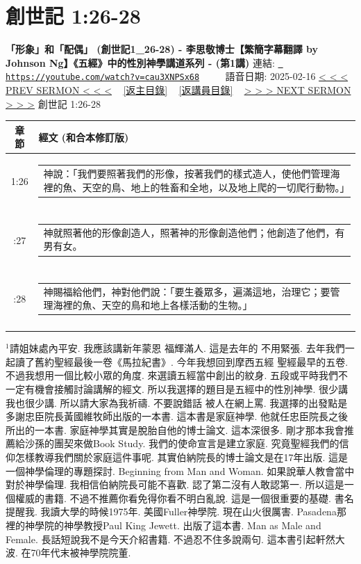 \documentclass{book}
\begin{document}
\section{創世記 1:26-28}
\label{sec:cau3XNPSx68}
\textbf{「形象」和「配偶」 (創世記1\_26-28) - 李思敬博士【繁簡字幕翻譯 by Johnson Ng】《五經》中的性別神學講道系列 - (第1講)}
\newline
\newline
連結: \href{https://youtube.com/watch?v=cau3XNPSx68}{\texttt{ https://youtube.com/watch?v=cau3XNPSx68}} ~~~~ 語音日期: 2025-02-16 
\newline
\newline
\hyperref[sec:qbcjpAyQDGE]{< < < PREV SERMON < < <}
~
\hyperlink{toc}{[返主目錄]}
~
\hyperref[ch:preacher5]{[返講員目錄]}
~
\hyperref[sec:dX_CJYSfYFI]{> > > NEXT SERMON > > >}
\newline
\newline
創世記 1:26-28
\newline
\begin{longtable}{cl}
\hline
\hline
章節 & 經文 (和合本修訂版)\\
\hline
1:26 & \begin{tabularx}{0.7\textwidth}{X} 神說：「我們要照著我們的形像，按著我們的樣式造人，使他們管理海裡的魚、天空的鳥、地上的牲畜和全地，以及地上爬的一切爬行動物。」 \end{tabularx} \\ \\ \relax
1:27 & \begin{tabularx}{0.7\textwidth}{X} 神就照著他的形像創造人，照著神的形像創造他們；他創造了他們，有男有女。 \end{tabularx} \\ \\ \relax
1:28 & \begin{tabularx}{0.7\textwidth}{X} 神賜福給他們，神對他們說：「要生養眾多，遍滿這地，治理它；要管理海裡的魚、天空的鳥和地上各樣活動的生物。」 \end{tabularx} \\ \\
[1ex]
\hline
\hline
\end{longtable}
$^{1}$請姐妹處內平安.
我應該講新年蒙恩 福輝滿人.
這是去年的 不用緊張.
去年我們一起讀了舊約聖經最後一卷《馬拉紀書》.
今年我想回到摩西五經 聖經最早的五卷.
不過我想用一個比較小眾的角度.
來選讀五經當中創出的紋身.
五段或平時我們不一定有機會接觸討論講解的經文.
所以我選擇的題目是五經中的性別神學.
很少講 我也很少講.
所以請大家為我祈禱.
不要說錯話 被人在網上罵.
我選擇的出發點是多謝忠臣院長黃國維牧師出版的一本書.
這本書是家庭神學.
他就任忠臣院長之後所出的一本書.
家庭神學其實是脫胎自他的博士論文.
這本深很多.
剛才那本我會推薦給沙孫的團契來做Book Study.
我們的使命宣言是建立家庭.
究竟聖經我們的信仰怎樣教導我們關於家庭這件事呢.
其實伯納院長的博士論文是在17年出版.
這是一個神學倫理的專題探討.
Beginning from Man and Woman.
如果說華人教會當中對於神學倫理.
我相信伯納院長可能不喜歡.
認了第二沒有人敢認第一.
所以這是一個權威的書籍.
不過不推薦你看免得你看不明白亂說.
這是一個很重要的基礎.
書名提醒我.
我讀大學的時候1975年.
美國Fuller神學院.
現在山火很厲害.
Pasadena那裡的神學院的神學教授Paul King Jewett.
出版了這本書.
Man as Male and Female.
長話短說我不是今天介紹書籍.
不過忍不住多說兩句.
這本書引起軒然大波.
在70年代末被神學院院董.
\end{document}
